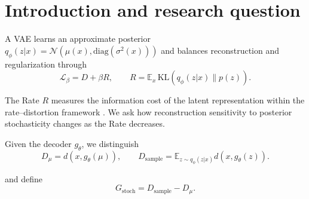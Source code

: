 \documentclass{article}
\begin{document}

\printAffiliationsAndNotice{}

\begin{abstract}
We investigate how the rate--distortion trade-off affects latent stochasticity in an audio Variational Autoencoder (VAE). We compare distortion obtained from the posterior mean with expected distortion under sampling, defining a stochasticity gap. As the Rate decreases, posterior uncertainty and the gap increase substantially. A controlled perturbation scale $\tau$ further reveals a local quadratic decoder sensitivity that becomes stronger at low Rate.
\end{abstract}

\section*{Introduction and research question}

A VAE learns an approximate posterior
$q_\phi(z|x)=\mathcal{N}(\mu(x),\mathrm{diag}(\sigma^2(x)))$
and balances reconstruction and regularization through
\citep{kingma2014,higgins2017}
\begin{equation}
\mathcal{L}_\beta = D + \beta R,
\qquad
R = \mathbb{E}_x\,\mathrm{KL}\!\left(q_\phi(z|x)\|p(z)\right).
\end{equation}

The Rate $R$ measures the information cost of the latent representation within the rate--distortion framework \citep{alemi2018}. We ask how reconstruction sensitivity to posterior stochasticity changes as the Rate decreases.

Given the decoder $g_\theta$, we distinguish
\begin{equation}
D_\mu = d(x,g_\theta(\mu)),
\qquad
D_{\mathrm{sample}} =
\mathbb{E}_{z\sim q_\phi(z|x)}
d(x,g_\theta(z)).
\end{equation}

and define
\begin{equation}
G_{\mathrm{stoch}} =
D_{\mathrm{sample}} - D_\mu.
\end{equation}
\end{document}
